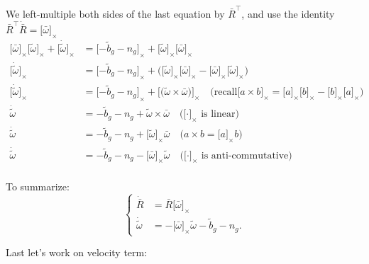 \documentclass[letter,10pt]{article}
\newcommand{\asym}[1]{{\lbrack #1\rbrack}_\times{}}
\begin{document}
We left-multiple both sides of the last equation by $\bar R^\top$, and use the identity $\bar R^\top\dot{\bar R}=\asym{\bar\omega}$
\begin{equation}
\begin{aligned}
 \asym{\bar \omega}\asym{\tilde \omega} + \asym{\dot{\tilde\omega}} &= \asym{-\tilde b_g - n_g} + \asym{\tilde\omega}\asym{\bar\omega}\\
 \asym{\dot{\tilde\omega}} &= \asym{-\tilde b_g - n_g} 
 + \big(\asym{\tilde\omega}\asym{\bar\omega} - \asym{\bar\omega}\asym{\tilde\omega}\big) \\
 \asym{\dot{\tilde\omega}} &= \asym{-\tilde b_g - n_g} + \asym{\big(\tilde\omega\times\bar\omega\big)} \quad\text{(recall} \asym{a\times b}=\asym{a}\asym{b}-\asym{b}\asym{a}\text{)}\\
\dot{\tilde\omega} &= -\tilde b_g - n_g + \tilde\omega\times\bar\omega \quad\text{(}\asym{\cdot} \text{ is linear)} \\
\dot{\tilde\omega} &= -\tilde b_g - n_g + \asym{\tilde\omega}\bar\omega \quad\text{(}a\times b=\asym{a}b \text{)}\\
\dot{\tilde\omega} &= -\tilde b_g - n_g - \asym{\bar\omega}\tilde\omega \quad\text{(}\asym{\cdot} \text{ is anti-commutative)}\\
\end{aligned}
\end{equation}

To summarize:
\begin{equation}
\begin{cases}
 \dot{\bar R} &= \bar R \asym{\bar \omega}\\
\dot{\tilde\omega} &= - \asym{\bar\omega}\tilde\omega -\tilde b_g - n_g.
\end{cases}
\end{equation}

Last let's work on velocity term:
\end{document}
